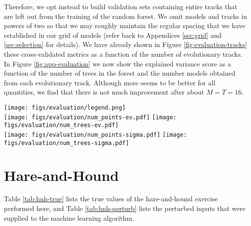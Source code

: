 \documentclass[manuscript]{aastex}
\begin{document}
Therefore, we opt instead to build validation sets containing entire tracks that are left out from the training of the random forest. We omit models and tracks in powers of two so that we may roughly maintain the regular spacing that we have established in our grid of models (refer back to Appendices \ref{sec:grid} and \ref{sec:selection} for details). We have already shown in Figure \ref{fig:evaluation-tracks} these cross-validated metrics as a function of the number of evolutionary tracks. In Figure \ref{fig:app-evaluation} we now show the explained variance score as a function of the number of trees in the forest and the number models obtained from each evolutionary track. Although more seems to be better for all quantities, we find that there is not much improvement after about $M=T=16$. 

\begin{figure*}
    \centering\texttt{[image: figs/evaluation/legend.png]}\\
    \texttt{[image: figs/evaluation/num\_points-ev.pdf]}\hfill
    \texttt{[image: figs/evaluation/num\_trees-ev.pdf]}\\
    \texttt{[image: figs/evaluation/num\_points-sigma.pdf]}\hfill
    \texttt{[image: figs/evaluation/num\_trees-sigma.pdf]}\\
    \caption{Explained variance (top) and accuracy per precision score (bottom) of each stellar parameter as a function of the number of models per evolutionary track (left) and the number of trees used in training the random forest (right). } 
    \label{fig:app-evaluation}
\end{figure*}


\section{Hare-and-Hound}
\label{sec:hare-and-hound}
Table \ref{tab:hnh-true} lists the true values of the hare-and-hound exercise performed here, and Table \ref{tab:hnh-perturb} lists the perturbed inputs that were supplied to the machine learning algorithm. 
\end{document}
